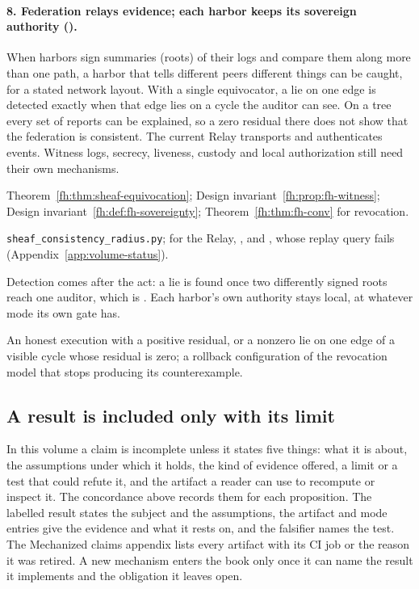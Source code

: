 \paragraph{8. Federation relays evidence; each harbor keeps its sovereign authority ().}
When harbors sign summaries (roots) of their logs and compare them along more
than one path, a harbor that tells different peers different things can be
caught, for a stated network layout. With a single equivocator, a lie on one
edge is detected exactly when that edge lies on a cycle the auditor can see. On
a tree every set of reports can be explained, so a zero residual there does not
show that the federation is consistent. The current Relay transports and
authenticates events. Witness logs, secrecy, liveness, custody and local
authorization still need their own mechanisms.
\begin{description}[leftmargin=1.4em,itemsep=1pt]
  \item[Result] Theorem~\ref{fh:thm:sheaf-equivocation};
  Design invariant~\ref{fh:prop:fh-witness}; Design
  invariant~\ref{fh:def:fh-sovereignty}; Theorem~\ref{fh:thm:fh-conv} for
  revocation.
  \item[Artifact] \texttt{sheaf\_consistency\_radius.py}; for the Relay,
  , 
  and , whose replay query fails
  (Appendix~\ref{app:volume-status}).
  \item[Mode] Detection comes after the act: a lie is found once two
  differently signed roots reach one auditor, which is .
  Each harbor's own authority stays local, at whatever mode its own gate has.
  \item[Falsifier] An honest execution with a positive residual, or a nonzero
  lie on one edge of a visible cycle whose residual is zero; a rollback configuration of
  the revocation model that stops producing its counterexample.
\end{description}

\subsection{A result is included only with its limit}
In this volume a claim is incomplete unless it states five things: what it is
about, the assumptions under which it holds, the kind of evidence offered, a
limit or a test that could refute it, and the artifact a reader can use to
recompute or inspect it. The concordance above records them for each
proposition. The labelled result states the subject and the assumptions, the
artifact and mode entries give the evidence and what it rests on, and the
falsifier names the test. The Mechanized claims appendix lists every
artifact with its CI job or the reason it was retired. A new mechanism enters the book
only once it can name the result it implements and the obligation it leaves
open.

